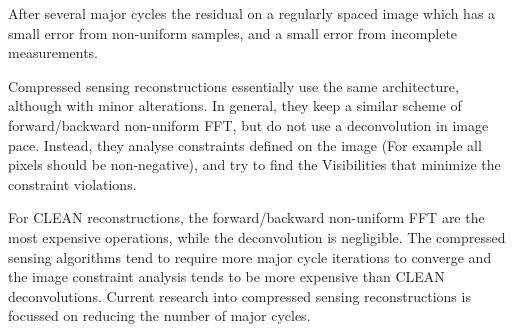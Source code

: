 After several major cycles the residual  on a regularly spaced image which has a small error from non-uniform samples, and a small error from incomplete measurements.

Compressed sensing reconstructions essentially use the same architecture, although with minor alterations. In general, they keep a similar scheme of forward/backward non-uniform FFT, but do not use a deconvolution in image pace. Instead, they analyse constraints defined on the image (For example all pixels should be non-negative), and try to find the Visibilities that minimize the constraint violations.

For CLEAN reconstructions, the forward/backward non-uniform FFT are the most expensive operations, while the deconvolution is negligible. The compressed sensing algorithms tend to require more major cycle iterations to converge and the image constraint analysis tends to be more expensive than CLEAN deconvolutions. Current research into compressed sensing reconstructions is focussed on reducing the number of major cycles\cite{dabbech2018cygnus}. 









